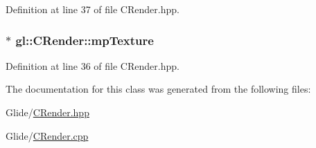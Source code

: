 Definition at line 37 of file C\-Render.\-hpp.

\hypertarget{classgl_1_1_c_render_ae6e4037e82d612aae8e25885538e96f9}{
\subsubsection[{mp\-Texture}]{$\ast$ gl\-::\-C\-Render\-::mp\-Texture\hspace{0.3cm}{\ttfamily [protected]}}}\label{classgl_1_1_c_render_ae6e4037e82d612aae8e25885538e96f9}


Definition at line 36 of file C\-Render.\-hpp.



The documentation for this class was generated from the following files\-:\begin{DoxyCompactItemize}
\item 
Glide/\hyperlink{_c_render_8hpp}{C\-Render.\-hpp}\item 
Glide/\hyperlink{_c_render_8cpp}{C\-Render.\-cpp}\end{DoxyCompactItemize}
